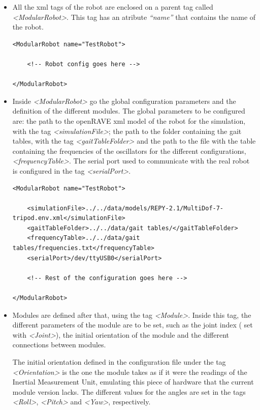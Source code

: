 \begin{itemize}
	\item All the xml tags of the robot are enclosed on a parent tag called \emph{<ModularRobot>}. This tag has an atribute \emph{``name''} that contains the name of the robot.
\XML
\begin{lstlisting}
<ModularRobot name="TestRobot">
	
    <!-- Robot config goes here -->
	
</ModularRobot>
\end{lstlisting}
	
	\item Inside \emph{<ModularRobot>} go the global configuration parameters and the definition of the different modules. The global parameters to be configured are: the path to the openRAVE xml model of the robot for the simulation, with the tag \emph{<simulationFile>}; the path to the folder containing the gait tables, with the tag \emph{<gaitTableFolder>} and the path to the file with the table containing the frequencies of the oscillators for the different configurations, \emph{<frequencyTable>}. The serial port used to communicate with the real robot is configured in the tag \emph{<serialPort>}.
	
\newpage
\XML
\begin{lstlisting}
<ModularRobot name="TestRobot">

    <simulationFile>../../data/models/REPY-2.1/MultiDof-7-tripod.env.xml</simulationFile>
    <gaitTableFolder>../../data/gait tables/</gaitTableFolder>
    <frequencyTable>../../data/gait tables/frequencies.txt</frequencyTable>
    <serialPort>/dev/ttyUSB0</serialPort>
	
    <!-- Rest of the configuration goes here -->
	
</ModularRobot>
\end{lstlisting}
	
	\item Modules are defined after that, using the tag \emph{<Module>}. Inside this tag, the different parameters of the module are to be set, such as the joint index ( set with \emph{<Joint>}), the initial orientation of the module and the different connections between modules.
	
	The initial orientation defined in the configuration file under the tag \emph{<Orientation>}  is the one the module takes as if it were the readings of the Inertial Measurement Unit, emulating this piece of hardware that the current module version lacks. The different values for the angles are set in the tags \emph{<Roll>}, \emph{<Pitch>} and \emph{<Yaw>}, respectively.\\
	

\end{itemize}
